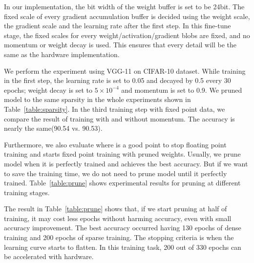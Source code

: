 In our implementation, the bit width of the weight buffer is set to be 24bit. The fixed scale of every gradient accumulation buffer is decided using the weight scale, the gradient scale and the learning rate after the first step. In this fine-tune stage, the fixed scales for every weight/activation/gradient blobs are fixed, and no momentum or weight decay is used. This ensures that every detail will be the same as the hardware implementation.

We perform the experiment using VGG-11\cite{Simonyan2014Very} on CIFAR-10\cite{krizhevsky2009learning} dataset. While training in the first step, the learning rate is set to 0.05 and decayed by 0.5 every 30 epochs; weight decay is set to $5 \times 10^{-4}$ and momentum is set to 0.9. We pruned model to the same sparsity in the whole experiments shown in Table~\ref{table:sparsity}. In the third training step with fixed point data, we compare the result of training with and without momentum. The accuracy is nearly the same(90.54 vs. 90.53). 

Furthermore, we also evaluate where is a good point to stop floating point training and starts fixed point training with pruned weights. Usually, we prune model when it is perfectly trained and achieves the best accuracy. But if we want to save the training time, we do not need to prune model until it perfectly trained. Table~\ref{table:prune} shows experimental results for pruning at different training stages. 




The result in Table~\ref{table:prune} shows that, if we start pruning at half of training, it may cost less epochs without harming accuracy, even with small accuracy improvement. The best accuracy occurred having 130 epochs of dense training and 200 epochs of sparse training. The stopping criteria is when the learning curve starts to flatten. In this training task, 200 out of 330 epochs can be accelerated with hardware.
